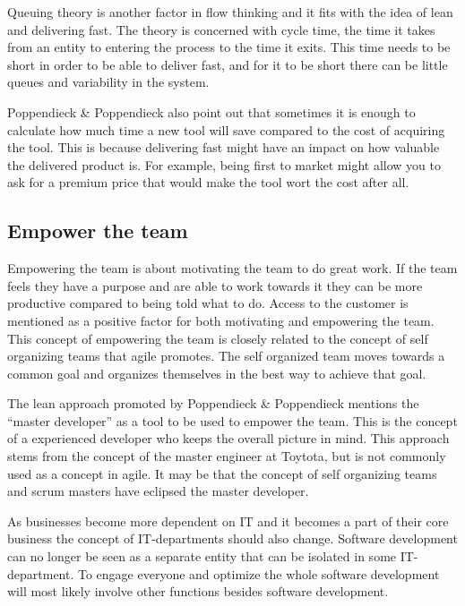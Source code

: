 Queuing theory is another factor in flow thinking and it fits with the idea of lean and delivering fast. The theory is concerned with cycle time, the time it takes from an entity to entering the process to the time it exits. This time needs to be short in order to be able to deliver fast, and for it to be short there can be little queues and variability in the system.\cite{poppendieck2003lean}

Poppendieck \& Poppendieck also point out that sometimes it is enough to calculate how much time a new tool will save compared to the cost of acquiring the tool. This is because delivering fast might have an impact on how valuable the delivered product is.\cite{poppendieck2003lean} For example, being first to market might allow you to ask for a premium price that would make the tool wort the cost after all.

\subsection{Empower the team}

Empowering the team is about motivating the team to do great work. If the team feels they have a purpose and are able to work towards it they can be more productive compared to being told what to do. Access to the customer is mentioned as a positive factor for both motivating and empowering the team.\cite{poppendieck2003lean} This concept of empowering the team is closely related to the concept of self organizing teams that agile promotes. The self organized team moves towards a common goal and organizes themselves in the best way to achieve that goal. 

The lean approach promoted by Poppendieck \& Poppendieck mentions the ``master developer'' as a tool to be used to empower the team. This is the concept of a experienced developer who keeps the overall picture in mind.\cite{poppendieck2003lean} This approach stems from the concept of the master engineer at Toytota\cite{poppendieck2003lean}, but is not commonly used as a concept in agile. It may be that the concept of self organizing teams and scrum masters have eclipsed the master developer.

As businesses become more dependent on IT and it becomes a part of their core business the concept of IT-departments should also change. Software development can no longer be seen as a separate entity that can be isolated in some IT-department. To engage everyone and optimize the whole software development will most likely involve other functions besides software development.\cite{Poppendieck2012Lean}


